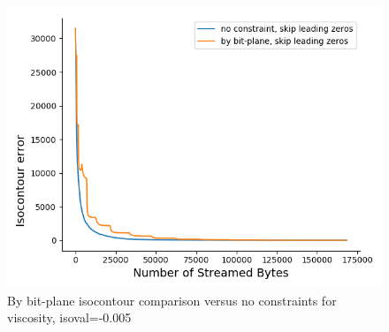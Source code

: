 \begin{figure}
  \centering
  \includegraphics[width=0.8\linewidth]{resources/isocontour-error-by-bit-plane-viscosity.png}
  \caption {By bit-plane isocontour comparison versus no constraints for viscosity, isoval=-0.005}
  \label{fig:by_bit_plane_isocontour}
\end{figure}
